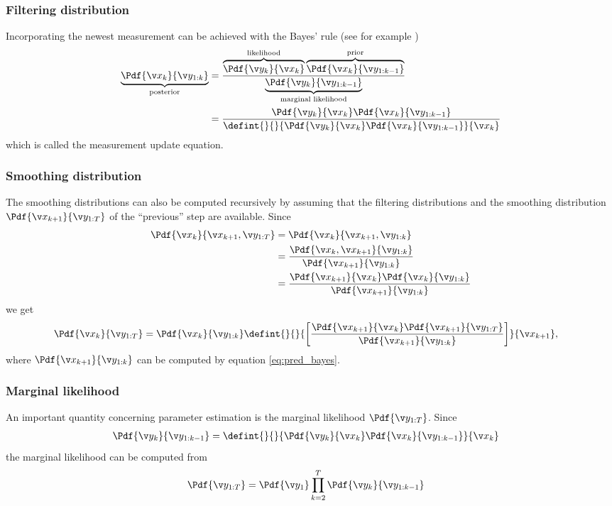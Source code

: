 \subsubsection*{Filtering distribution}
Incorporating the newest measurement can be achieved with the Bayes'
rule (see for example \cite{gelman2004})
\begin{align}
	\underbrace{\Pdf{\xk}{\y_{1:k}}}_\text{posterior}&=\frac{\overbrace{\Pdf{\yk}{\xk}}^\text{likelihood}\overbrace{\Pdf{\xk}{\y_{1:k-1}}}^\text{prior}}{\underbrace{\Pdf{\y_{k}}{\y_{1:k-1}}}_\text{marginal likelihood}}\nonumber\\
	&=\frac{\Pdf{\yk}{\xk}\Pdf{\xk}{\y_{1:k-1}}}{\defint{}{}{\Pdf{\yk}{\xk}\Pdf{\xk}{\y_{1:k-1}}}{\xk}}
\end{align}
which is called the measurement update equation.

\subsubsection*{Smoothing distribution}
The smoothing distributions can also be computed recursively by assuming that the filtering distributions
and the smoothing distribution $\Pdf{\x_{k+1}}{\y_{1:T}}$ of the ``previous'' step are available.
Since
\begin{align*}
	\Pdf{\xk}{\x_{k+1},\y_{1:T}}&=\Pdf{\xk}{\x_{k+1},\y_{1:k}}\\
	&=\frac{\Pdf{\xk,\x_{k+1}}{\y_{1:k}}}{\Pdf{\x_{k+1}}{\y_{1:k}}}\\
	&=\frac{\Pdf{\x_{k+1}}{\xk}\Pdf{\xk}{\y_{1:k}}}{\Pdf{\x_{k+1}}{\y_{1:k}}}
\end{align*}
we get
\begin{align}
	\Pdf{\xk}{\y_{1:T}}&=\Pdf{\xk}{\y_{1:k}}\defint{}{}{\left[\frac{\Pdf{\x_{k+1}}{\xk}\Pdf{\x_{k+1}}{\y_{1:T}}}{\Pdf{\x_{k+1}}{\y_{1:k}}}\right]}{\x_{k+1}},
\end{align}
where $\Pdf{\x_{k+1}}{\y_{1:k}}$ can be computed by equation \eqref{eq:pred_bayes}.

\subsubsection*{Marginal likelihood}

An important quantity concerning parameter estimation is the marginal likelihood $\Pdf{\y_{1:T}}$. Since
\begin{align}
	\Pdf{\y_k}{\y_{1:k-1}}&=\defint{}{}{\Pdf{\yk}{\xk}\Pdf{\xk}{\y_{1:k-1}}}{\xk}
\end{align}
the marginal likelihood can be computed from
\begin{align}
	\Pdf{\y_{1:T}}&=\Pdf{\y_1}\prod_{k=2}^T \Pdf{\y_k}{\y_{1:k-1}}
\end{align}


